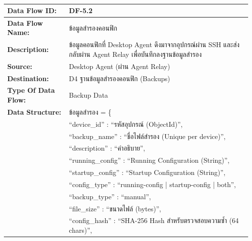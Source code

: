 \begin{table}[H]
    \caption{}
    \label{tab:df-5-2}
    \fontSixTeen 
    \begin{tabularx}{\textwidth}{|l|L|} 
        \hline
        \textbf{Data Flow ID:} & DF-5.2 \\
        \hline
        \textbf{Data Flow Name:} & ข้อมูลสำรองคอนฟิก \\
        \hline
        \textbf{Description:} & ข้อมูลคอนฟิกที่ Desktop Agent ดึงมาจากอุปกรณ์ผ่าน SSH และส่งกลับผ่าน Agent Relay เพื่อบันทึกลงฐานข้อมูลสำรอง \\
        \hline
        \textbf{Source:} & Desktop Agent (ผ่าน Agent Relay) \\
        \hline
        \textbf{Destination:} & D4 ฐานข้อมูลสำรองคอนฟิก (Backups) \\
        \hline
        \textbf{Type Of Data Flow:} & Backup Data \\
        \hline
        \textbf{Data Structure:} & ข้อมูลสำรอง = \{ \nonumber \\
                        & \hspace{1em} ``device\_id'' : ``รหัสอุปกรณ์ (ObjectId)'', \nonumber \\
                        & \hspace{1em} ``backup\_name'' : ``ชื่อไฟล์สำรอง (Unique per device)'', \nonumber \\
                        & \hspace{1em} ``description'' : ``คำอธิบาย'', \nonumber \\
                        & \hspace{1em} ``running\_config'' : ``Running Configuration (String)'', \nonumber \\
                        & \hspace{1em} ``startup\_config'' : ``Startup Configuration (String)'', \nonumber \\
                        & \hspace{1em} ``config\_type'' : ``running-config | startup-config | both'', \nonumber \\
                        & \hspace{1em} ``backup\_type'' : ``manual'', \nonumber \\
                        & \hspace{1em} ``file\_size'' : ``ขนาดไฟล์ (bytes)'', \nonumber \\
                        & \hspace{1em} ``config\_hash'' : ``SHA-256 Hash สำหรับตรวจสอบความซ้ำ (64 chars)'', \nonumber \\

\end{tabularx}
\end{table}
